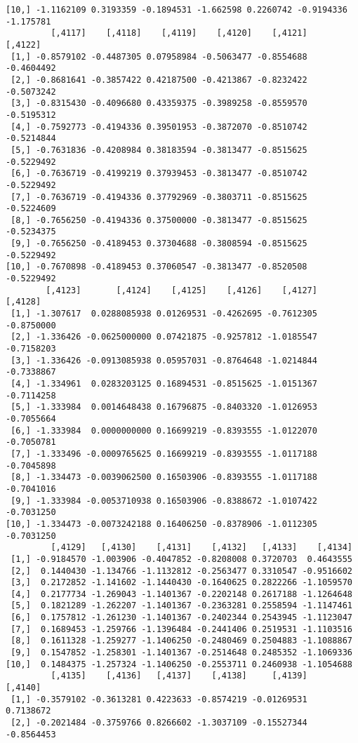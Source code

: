 \documentclass[
  letterpaper,
  DIV=11,
  numbers=noendperiod]{scrreprt}
\begin{document}
\begin{verbatim}
[10,] -1.1162109 0.3193359 -0.1894531 -1.662598 0.2260742 -0.9194336 -1.175781
         [,4117]    [,4118]    [,4119]    [,4120]    [,4121]    [,4122]
 [1,] -0.8579102 -0.4487305 0.07958984 -0.5063477 -0.8554688 -0.4604492
 [2,] -0.8681641 -0.3857422 0.42187500 -0.4213867 -0.8232422 -0.5073242
 [3,] -0.8315430 -0.4096680 0.43359375 -0.3989258 -0.8559570 -0.5195312
 [4,] -0.7592773 -0.4194336 0.39501953 -0.3872070 -0.8510742 -0.5214844
 [5,] -0.7631836 -0.4208984 0.38183594 -0.3813477 -0.8515625 -0.5229492
 [6,] -0.7636719 -0.4199219 0.37939453 -0.3813477 -0.8510742 -0.5229492
 [7,] -0.7636719 -0.4194336 0.37792969 -0.3803711 -0.8515625 -0.5224609
 [8,] -0.7656250 -0.4194336 0.37500000 -0.3813477 -0.8515625 -0.5234375
 [9,] -0.7656250 -0.4189453 0.37304688 -0.3808594 -0.8515625 -0.5229492
[10,] -0.7670898 -0.4189453 0.37060547 -0.3813477 -0.8520508 -0.5229492
        [,4123]       [,4124]    [,4125]    [,4126]    [,4127]    [,4128]
 [1,] -1.307617  0.0288085938 0.01269531 -0.4262695 -0.7612305 -0.8750000
 [2,] -1.336426 -0.0625000000 0.07421875 -0.9257812 -1.0185547 -0.7158203
 [3,] -1.336426 -0.0913085938 0.05957031 -0.8764648 -1.0214844 -0.7338867
 [4,] -1.334961  0.0283203125 0.16894531 -0.8515625 -1.0151367 -0.7114258
 [5,] -1.333984  0.0014648438 0.16796875 -0.8403320 -1.0126953 -0.7055664
 [6,] -1.333984  0.0000000000 0.16699219 -0.8393555 -1.0122070 -0.7050781
 [7,] -1.333496 -0.0009765625 0.16699219 -0.8393555 -1.0117188 -0.7045898
 [8,] -1.334473 -0.0039062500 0.16503906 -0.8393555 -1.0117188 -0.7041016
 [9,] -1.333984 -0.0053710938 0.16503906 -0.8388672 -1.0107422 -0.7031250
[10,] -1.334473 -0.0073242188 0.16406250 -0.8378906 -1.0112305 -0.7031250
         [,4129]   [,4130]    [,4131]    [,4132]   [,4133]    [,4134]
 [1,] -0.9184570 -1.003906 -0.4047852 -0.8208008 0.3720703  0.4643555
 [2,]  0.1440430 -1.134766 -1.1132812 -0.2563477 0.3310547 -0.9516602
 [3,]  0.2172852 -1.141602 -1.1440430 -0.1640625 0.2822266 -1.1059570
 [4,]  0.2177734 -1.269043 -1.1401367 -0.2202148 0.2617188 -1.1264648
 [5,]  0.1821289 -1.262207 -1.1401367 -0.2363281 0.2558594 -1.1147461
 [6,]  0.1757812 -1.261230 -1.1401367 -0.2402344 0.2543945 -1.1123047
 [7,]  0.1689453 -1.259766 -1.1396484 -0.2441406 0.2519531 -1.1103516
 [8,]  0.1611328 -1.259277 -1.1406250 -0.2480469 0.2504883 -1.1088867
 [9,]  0.1547852 -1.258301 -1.1401367 -0.2514648 0.2485352 -1.1069336
[10,]  0.1484375 -1.257324 -1.1406250 -0.2553711 0.2460938 -1.1054688
         [,4135]    [,4136]   [,4137]    [,4138]     [,4139]    [,4140]
 [1,] -0.3579102 -0.3613281 0.4223633 -0.8574219 -0.01269531  0.7138672
 [2,] -0.2021484 -0.3759766 0.8266602 -1.3037109 -0.15527344 -0.8564453

\end{verbatim}
\end{document}
